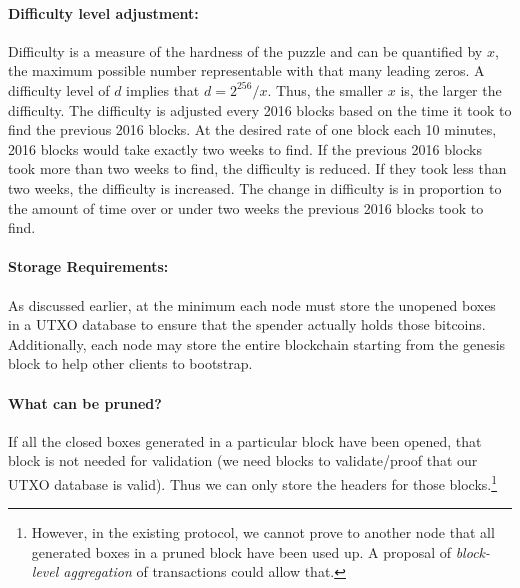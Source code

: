 \documentclass[]{report}   %
\begin{document}
\paragraph{Difficulty level adjustment:} Difficulty is a measure of the hardness of the puzzle and can be quantified by $x$, the maximum possible number representable with that many leading zeros. 
A difficulty level of $d$ implies that $d = 2^{256}/x$. Thus, the smaller $x$ is, the larger the difficulty. The difficulty is adjusted every 2016 blocks based on the time it took to find the previous 2016 blocks. At the desired rate of one block each 10 minutes, 2016 blocks would take exactly two weeks to find. If the previous 2016 blocks took more than two weeks to find, the difficulty is reduced. If they took less than two weeks, the difficulty is increased. The change in difficulty is in proportion to the amount of time over or under two weeks the previous 2016 blocks took to find.

\paragraph{Storage Requirements:} As discussed earlier, at the minimum each node must store the unopened boxes in a UTXO database to ensure that the spender actually holds those bitcoins. Additionally, each node may store the entire blockchain starting from the genesis block to help other clients to bootstrap. 

\paragraph{What can be pruned?} If all the closed boxes generated in a particular block have been opened, that block is not needed for validation (we need blocks to validate/proof that our UTXO database is valid). Thus we can only store the headers for those blocks.\footnote{However, in the existing protocol, we cannot prove to another node that all generated boxes in a pruned block have been used up. A proposal of {\em block-level aggregation} of transactions could allow that.}
\end{document}
